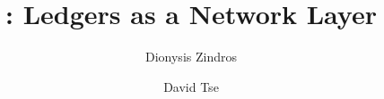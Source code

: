 \title{
  \rollerblade:
  Ledgers as a Network Layer
}
\ifanonymous{\iflncs
\author{}\institute{}
\fi}
\else
\author{
  Dionysis Zindros\and
  David Tse
}
\iflncs
{}
\else
{}
\fi
\fi
